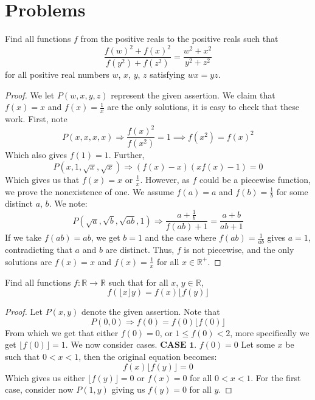 \documentclass[11pt]{scrartcl}
\begin{document}
\newpage{}

\section{Problems}

\begin{problem}
  [IMO 2008]
  Find all functions $f$ from the positive reals to the positive reals such that
  \[
  \frac{f(w)^2 + f(x)^2}{f(y^2) + f(z^2)} = \frac{w^2 + x^2}{y^2 + z^2}
  \]
  for all positive real numbers $w$, $x$, $y$, $z$ satisfying $wx=yz$.
\end{problem}

\begin{proof}
  We let $P(w, x, y, z)$ represent the given assertion. We claim that $f(x) = x$ and $f(x) = \frac 1x$ are the only solutions, it is
  easy to check that these work. \newline \newline
  First, note
  \[
  P(x, x, x, x) \Longrightarrow \frac{f(x)^2}{f(x^2)} = 1 \implies f(x^2) = f(x)^2
  \]
  Which also gives $f(1) = 1$. Further,
  \[
  P(x, 1, \sqrt x, \sqrt x) \Longrightarrow (f(x)-x)(xf(x)-1) = 0
  \]
  Which gives us that $f(x) = x$ or $\frac 1x$. However, as $f$ could be a piecewise function, we prove the nonexistence of one.
  \newline \newline
  We assume $f(a) = a$ and $f(b) = \frac 1b$ for some distinct $a$, $b$. We note:
  \[
  P(\sqrt a, \sqrt b, \sqrt{ab}, 1) \Longrightarrow \frac{a+\frac 1b}{f(ab) + 1} = \frac{a+b}{ab + 1}
  \]
  If we take $f(ab) = ab$, we get $b=1$ and the case where $f(ab) = \frac{1}{ab}$ gives $a=1$, contradicting that $a$ and $b$ are distinct.
  Thus, $f$ is not piecewise, and the only solutions are $f(x) = x$ and $f(x) = \frac 1x$ for all $x \in \mathbb{R}^+$.
\end{proof}

\begin{problem}
  [IMO 2010]
  Find all functions $f: \mathbb{R} \rightarrow \mathbb{R}$ such that for all $x$, $y \in \mathbb{R}$,
  \[
  f(\lfloor x \rfloor y) = f(x) \lfloor f(y) \rfloor
  \]
\end{problem}

\begin{proof}
  Let $P(x, y)$ denote the given assertion. Note that
  \[
  P(0, 0) \Longrightarrow f(0) = f(0) \lfloor f(0) \rfloor
  \]
  From which we get that either $f(0) = 0$, or $1 \le f(0) < 2$, more specifically we get $\lfloor f(0) \rfloor = 1$. We now
  consider cases.
  \newline \newline
  $\boxed{\textbf{CASE 1.}}$ $f(0) = 0$
  Let some $x$ be such that $0 < x < 1$, then the original equation becomes:
  \[
  f(x) \lfloor f(y) \rfloor = 0
  \]
  Which gives us either $\lfloor f(y) \rfloor = 0$ or $f(x) = 0$ for all $0<x<1$. For the first case, consider now
  $P(1, y)$ giving us $f(y) = 0$ for all $y$.
\end{proof}
\end{document}
